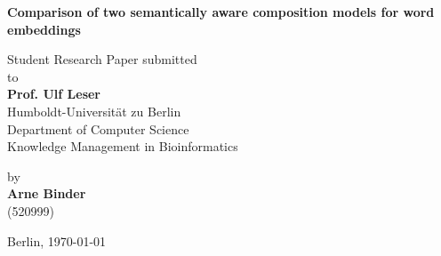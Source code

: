 \begin{center}

    {\Large{\bf Comparison of two semantically aware composition models for word embeddings}} \vspace{0.5cm}


    {\normalsize Student Research Paper submitted\\\vspace{0.5cm}
    to}\\\vspace{0.5cm}
    {\normalsize{\bf Prof. Ulf Leser}} \\\vspace{0.5cm}
    {\normalsize Humboldt-Universität zu Berlin \\
    Department of Computer Science \\
    Knowledge Management in Bioinformatics} \vspace{1cm}


    {\normalsize by \\\vspace{0.5cm}
    {\bf Arne Binder} \\
    (520999)} \vspace{1cm}


    {\normalsize Berlin, \today}

\end{center}
